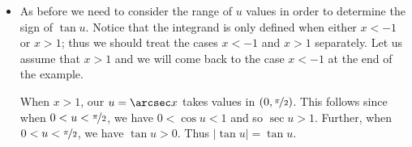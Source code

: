 \begin{eg}
\begin{itemize}
%
\item As before we need to consider the range of $u$ values in order to determine the
sign of $\tan u$. Notice that the integrand is only defined when either $x<-1$ or $x>1$;
thus we should treat the cases $x<-1$ and $x>1$ separately. Let us assume that $x>1$ and
we will come back to the case $x<-1$ at the end of the example.

When $x>1$, our $u=\arcsec x$ takes values in $(0,\nicefrac\pi2)$. This follows
since when $0<u<\nicefrac\pi2$, we have $0<\cos u<1$ and so $\sec u>1$. Further, when
$0<u<\nicefrac\pi2$, we have $\tan u>0$. Thus $|\tan u|=\tan u$.


\end{itemize}
\end{eg}

